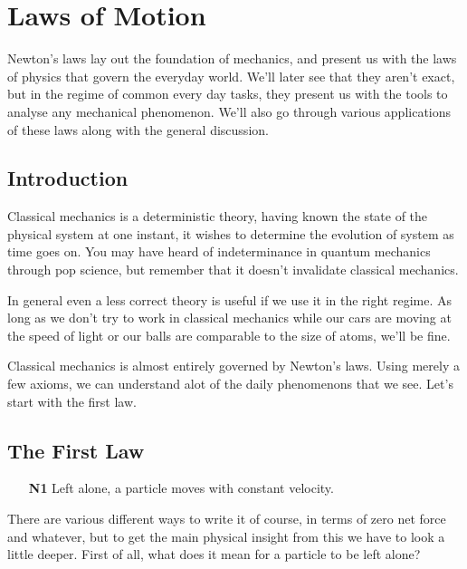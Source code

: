 \setlength{\chnumsep}{11.6em}
\chapter{Laws of Motion}

\begin{overview}
    Newton's laws lay out the foundation of mechanics, and present us with the laws of physics 
    that govern the everyday world. We'll later see that they aren't exact, but in the regime of common 
    every day tasks, they present us with the tools to analyse any mechanical phenomenon. We'll also go 
    through various applications of these laws along with the general discussion.
\end{overview}

\section{Introduction}

Classical mechanics is a deterministic theory, having known the state of the physical system at one instant,
it wishes to determine the evolution of system as time goes on. You may have heard of indeterminance in quantum 
mechanics through pop science, but remember that it doesn't invalidate classical mechanics. 

In general 
even a less correct theory is useful if we use it in the right regime. As long as we don't try to work 
in classical mechanics while our cars are moving at the speed of light or our balls are comparable to 
the size of atoms, we'll be fine.

Classical mechanics is almost entirely governed by Newton's laws. Using merely a few axioms, 
we can understand alot of the daily phenomenons that we see. Let's start with the first law. 

\section{The First Law}

\begin{enumerate}
    \item[\textbf{N1}] Left alone, a particle moves with constant velocity.
\end{enumerate}

There are various different ways to write it of course, in terms of zero net force and whatever, but to 
get the main physical insight from this we have to look a little deeper. First of all, what does it mean for 
a particle to be left alone? 


